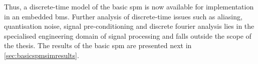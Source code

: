 Thus,  a  discrete-time model  of  the  basic  \gls{spm}  is now  available  for
implementation  in  an embedded  \gls{bms}.  Further  analysis of  discrete-time
issues  such  as  aliasing,  quantisation  noise,  signal  pre-conditioning  and
discrete fourier analysis  lies in the specialised engineering  domain of signal
processing and falls outside  the scope of the thesis. The  results of the basic
\gls{spm} are presented next in \cref{sec:basicspmsimresults}.

\FloatBarrier






